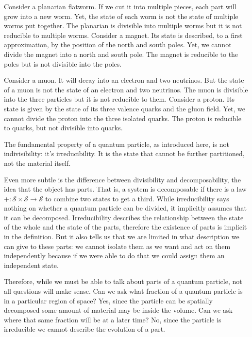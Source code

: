 \documentclass[smallextended]{svjour3}
\numberwithin{equation}{section}
\theoremstyle{definition}
\begin{document}
Consider a planarian flatworm. If we cut it into multiple pieces, each part will grow into a new worm. Yet, the state of each worm is not the state of multiple worms put together. The planarian is divisible into multiple worms but it is not reducible to multiple worms. Consider a magnet. Its state is described, to a first approximation, by the position of the north and south poles. Yet, we cannot divide the magnet into a north and south pole. The magnet is reducible to the poles but is not divisible into the poles.

Consider a muon. It will decay into an electron and two neutrinos. But the state of a muon is not the state of an electron and two neutrinos. The muon is divisible into the three particles but it is not reducible to them. Consider a proton. Its state is given by the state of its three valence quarks and the gluon field. Yet, we cannot divide the proton into the three isolated quarks. The proton is reducible to quarks, but not divisible into quarks.

The fundamental property of a quantum particle, as introduced here, is not indivisibility: it's irreducibility. It is the state that cannot be further partitioned, not the material itself.

Even more subtle is the difference between divisibility and decomposability, the idea that the object has parts. That is, a system is decomposable if there is a law $+ : \mathcal{S} \times \mathcal{S} \rightarrow \mathcal{S}$ to combine two states to get a third. While irreducibility says nothing on whether a quantum particle can be divided, it implicitly assumes that it can be decomposed. Irreducibility describes the relationship between the state of the whole and the state of the parts, therefore the existence of parts is implicit in the definition. But it also tells us that we are limited in what description we can give to these parts: we cannot isolate them as we want and act on them independently because if we were able to do that we could assign them an independent state.

Therefore, while we must be able to talk about parts of a quantum particle, not all questions will make sense. Can we ask what fraction of a quantum particle is in a particular region of space? Yes, since the particle can be spatially decomposed some amount of material may be inside the volume. Can we ask where that same fraction will be at a later time? No, since the particle is irreducible we cannot describe the evolution of a part.
\end{document}
